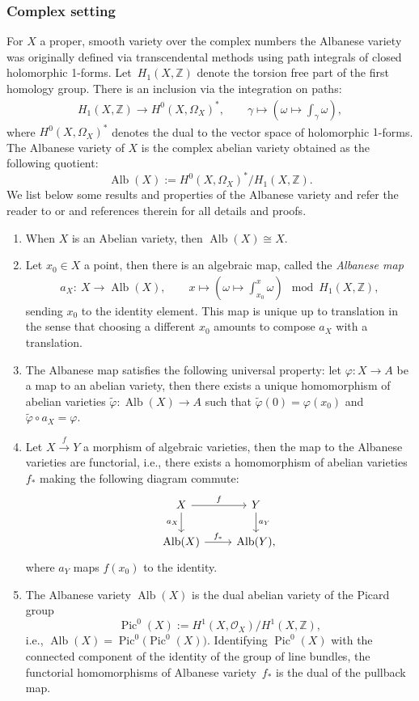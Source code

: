 \documentclass[pdftex]{sigma}
\newcommand{\Pic}{\operatorname{Pic}}
\newcommand{\Alb}{\operatorname{Alb}}
\numberwithin{equation}{section}
\theoremstyle{definition}
\begin{document}
\subsubsection{Complex setting}
For $X$ a proper, smooth variety over the complex numbers the Albanese variety was originally defined via transcendental methods using path integrals of closed holomorphic 1-forms. Let~$H_1(X,\mathbb Z)$ denote the torsion free part of the first homology group. There is an inclusion via the integration on paths:
\begin{align*}
 H_1(X,\mathbb Z)\longrightarrow H^0(X,\Omega_X)^*,\qquad
 \gamma\longmapsto \left(\omega\mapsto\int_{\gamma}\omega\right),
\end{align*}
where $ H^0(X,\Omega_X)^*$ denotes the dual to the vector space of holomorphic $1$-forms.
The Albanese variety of $X$ is the complex abelian variety obtained as the following quotient:
\[\Alb(X):=H^0(X,\Omega_X)^*\slash H_1(X,\mathbb Z). \]
We list below some results and properties of the Albanese variety and refer the reader to \cite[Section~11.11]{birkenhake} or \cite{mumford1974abelian} and references therein for all details and proofs.
\begin{enumerate}\itemsep=0pt
 \item[(1)] When $X$ is an Abelian variety, then $\Alb(X)\cong X$.
 \item[(2)] Let $x_0\in X$ a point, then there is an algebraic map, called the \emph{Albanese map}
 \begin{align*}
 a_{X}\colon \ X\longrightarrow \Alb(X),\qquad
 x\longmapsto\left(\omega\mapsto\int_{x_0}^x\omega\right) \mod H_1(X,\mathbb Z),
 \end{align*}
 sending $x_0$ to the identity element. This map is unique up to translation in the sense that choosing a different $x_0$ amounts to compose $a_X$ with a translation.
 \item[(3)] The Albanese map satisfies the following universal property:
 let $\varphi\colon X\to A$ be a map to an abelian variety, then there exists a unique homomorphism of abelian varieties $\widetilde{\varphi}\colon \Alb(X)\to A $ such that $\widetilde{\varphi}(0)=\varphi(x_0)$ and $\widetilde{\varphi}\circ a_{X}=\varphi$.
 \item[(4)] Let $X\xrightarrow{f} Y$ a morphism of algebraic varieties, then the map to the Albanese varieties are functorial, i.e., there exists a homomorphism of abelian varieties $f_*$ making the following diagram commute:
 \[
 \begin{tikzcd}
 X \arrow[r,"f"] \arrow[d,"a_X"']& Y \arrow[d,"a_Y"] \\
 \Alb(X) \arrow[r,"f_*"] & \Alb(Y),
 \end{tikzcd}
\]
 where $a_Y$ maps $f(x_0)$ to the identity.
 \item[(5)] The Albanese variety $\Alb(X)$ is the dual abelian variety of the Picard group
 \[\Pic^0(X):=H^1(X,\mathcal O_X)\slash H^1(X,\mathbb Z), \]
 i.e.,
 $\Alb(X)=\Pic^0\bigl(\Pic^0(X)\bigr)$.
 Identifying $\Pic^0(X)$ with the connected component of the identity of the group of line bundles, the functorial homomorphisms of Albanese variety~$f_*$ is the dual of the pullback map.
\end{enumerate}
\end{document}
